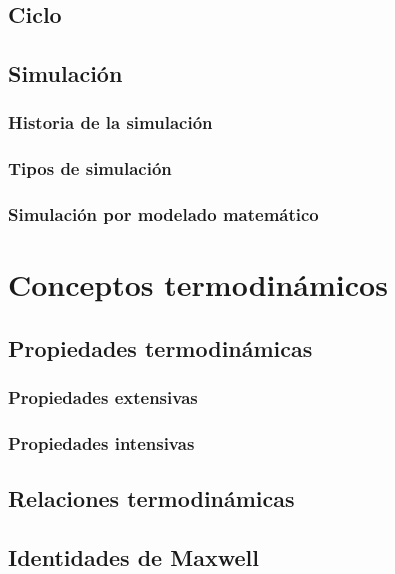 \subsection{Ciclo}

\subsection{Simulación}

\subsubsection{Historia de la simulación}

\subsubsection{Tipos de simulación}

\subsubsection{Simulación por modelado matemático}


\section{Conceptos termodinámicos}

\subsection{Propiedades termodinámicas}

\subsubsection{Propiedades extensivas}

\subsubsection{Propiedades intensivas}

\subsection{Relaciones termodinámicas}

\subsection{Identidades de Maxwell}


